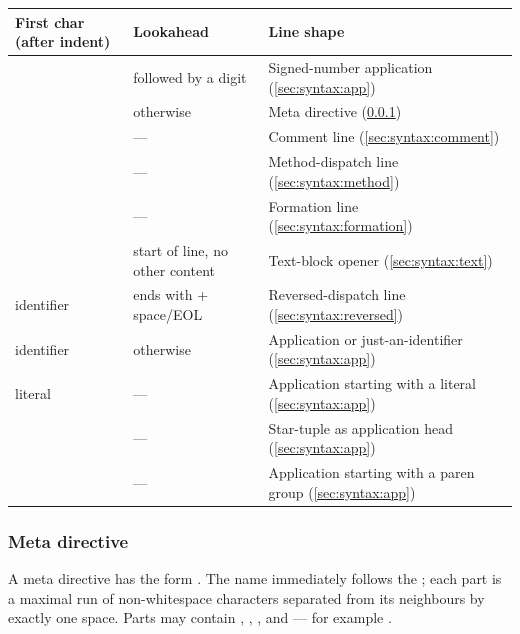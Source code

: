 \begin{table}
\label{tab:line-shapes}
\small
\begin{tabularx}{\textwidth}{l l X}
\toprule
First char (after indent) & Lookahead & Line shape \\
\midrule
\ff{+}      & followed by a digit             & Signed-number application (\cref{sec:syntax:app}) \\
\ff{+}      & otherwise                       & Meta directive (\cref{sec:syntax:meta}) \\
\ff{\#}     & ---                             & Comment line (\cref{sec:syntax:comment}) \\
\ff{.}      & ---                             & Method-dispatch line (\cref{sec:syntax:method}) \\
\ff{[}      & ---                             & Formation line (\cref{sec:syntax:formation}) \\
\ff{"""}    & start of line, no other content & Text-block opener (\cref{sec:syntax:text}) \\
identifier  & ends with \ff{.} + space/EOL    & Reversed-dispatch line (\cref{sec:syntax:reversed}) \\
identifier  & otherwise                       & Application or just-an-identifier (\cref{sec:syntax:app}) \\
literal     & ---                             & Application starting with a literal (\cref{sec:syntax:app}) \\
\ff{*}      & ---                             & Star-tuple as application head (\cref{sec:syntax:app}) \\
\ff{(}      & ---                             & Application starting with a paren group (\cref{sec:syntax:app}) \\
\bottomrule
\end{tabularx}
\end{table}

\subsubsection{Meta directive}\label{sec:syntax:meta}

A meta directive has the form
  .
The name immediately follows the \ff{+}; each part is a maximal run of
  non-whitespace characters separated from its neighbours by exactly one space.
Parts may contain \ff{:}, , \ff{-}, and \ff{/} ---
  for example .

